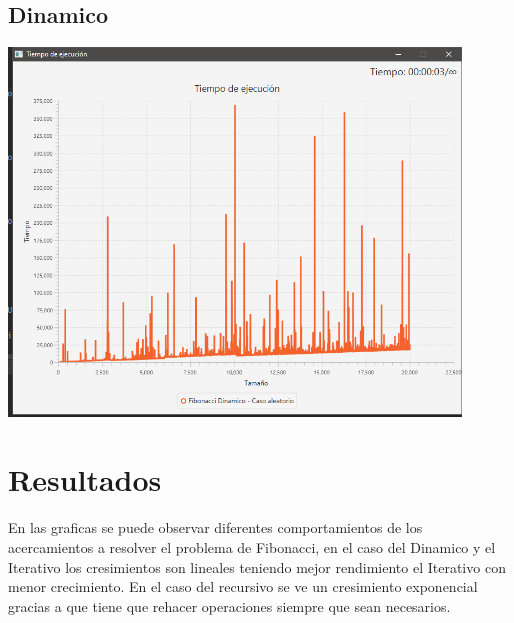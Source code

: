 \documentclass{article}
\begin{document}
\subsection{Dinamico}
\includegraphics[width=12cm]{dinamico.png}\\
\section{Resultados}
En las graficas se puede observar diferentes comportamientos de los
acercamientos a resolver el problema de Fibonacci, en el caso del Dinamico
y el Iterativo los cresimientos son lineales teniendo mejor rendimiento el 
Iterativo con menor crecimiento. En el caso del recursivo se ve un cresimiento
exponencial gracias a que tiene que rehacer operaciones siempre que sean
necesarios.
\end{document}
